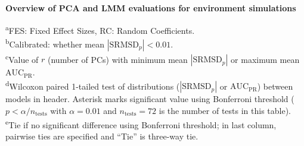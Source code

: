 \documentclass[11pt]{article}
\newcommand{\rmsd}{\text{SRMSD}_p}
\newcommand{\auc}{\text{AUC}_\text{PR}}
\begin{document}
\begin{table}[b!]
  \centering
  \tiny
  \caption{
    \textbf{Overview of PCA and LMM evaluations for environment simulations}
  }
  \label{tab:human_sum_pcs_env}
  \begin{flushleft}
    \textsuperscript{a}FES: Fixed Effect Sizes, RC: Random Coefficients.\\
    \textsuperscript{b}Calibrated: whether mean $|\rmsd| < 0.01$.\\
    \textsuperscript{c}Value of $r$ (number of PCs) with minimum mean $|\rmsd|$ or maximum mean $\auc$.\\
    \textsuperscript{d}Wilcoxon paired 1-tailed test of distributions ($|\rmsd|$ or $\auc$) between models in header.
    Asterisk marks significant value using Bonferroni threshold ($p < \alpha/n_\text{tests}$ with $\alpha = 0.01$ and $n_\text{tests} = 72$ is the number of tests in this table).\\
    \textsuperscript{e}Tie if no significant difference using Bonferroni threshold; in last column, pairwise ties are specified and ``Tie'' is three-way tie.
  \end{flushleft}
\end{table}
\end{document}
